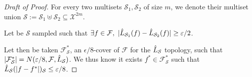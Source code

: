 \begin{proof}[Draft of Proof]
	For every two multisets $\mathcal{S}_1, \mathcal{S}_2$ of size $m$, we denote their multiset union $\mathcal{S} := \mathcal{S}_1 \uplus \mathcal{S}_2 \subseteq \mathcal{X}^{2m}$.

	Let be $\mathcal{S}$ sampled such that $\exists f \in \mathcal{F},\ |\estloss{\mathcal{S}_1}(\query) - \estloss{\mathcal{S}_2}(\query)| \geq \epsilon/2$. 
	
	Let then be taken $\mathcal{F^*_\mathcal{S}}$, an $\epsilon/8$-cover of $\mathcal{F}$ for the $\hat{L}_{\mathcal{S}}$ topology, such that $|\mathcal{F^*_\mathcal{S}}| = N(\varepsilon/8, \mathcal{F}, \hat{L}_{\mathcal{S}})$. We thus know it exists $f^* \in \mathcal{F^*_\mathcal{S}}$ such that $\hat{L}_{\mathcal{S}}(|f-f^*|)_{\mathcal{S}} \leq \varepsilon/8$.


\end{proof}
